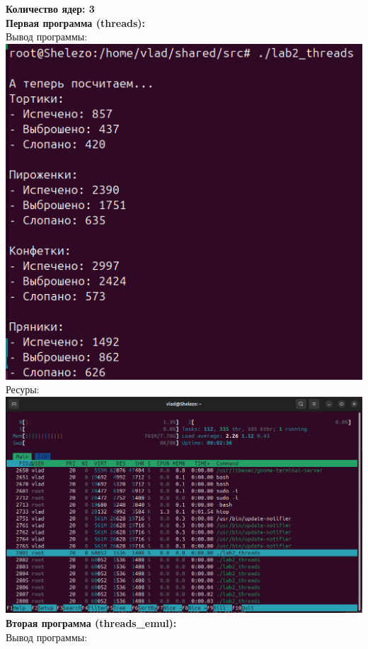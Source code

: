 \documentclass[a4paper,14pt]{extarticle}
\begin{document}
\textbf{Количество ядер: 3}\\
\textbf{Первая программа (threads):}\\
Вывод программы:\\
\includegraphics[width=140mm]{threads_output_3}\\
Ресуры:\\
\includegraphics[width=140mm]{threads_resources_3}\\
\textbf{Вторая программа (threads\_emul):}\\
Вывод программы:\\
\end{document}
